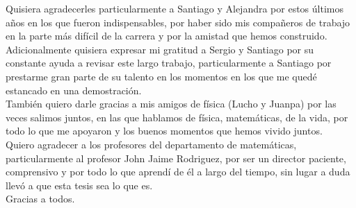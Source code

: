 Quisiera agradecerles particularmente a Santiago y Alejandra por estos últimos años en los que fueron indispensables, por haber sido mis compañeros de trabajo en la parte más difícil de la carrera y por la amistad que hemos construido.\\

Adicionalmente quisiera expresar mi gratitud a Sergio y Santiago por su constante ayuda a revisar este largo trabajo, particularmente a Santiago por prestarme gran parte de su talento en los momentos en los que me quedé estancado en una demostración.\\

También quiero darle gracias a  mis amigos de física (Lucho y Juanpa) por las veces salimos juntos, en las que hablamos de física, matemáticas, de la vida, por todo lo que me apoyaron y los buenos momentos que hemos vivido juntos.\\

Quiero agradecer a los profesores del departamento de matemáticas, particularmente al profesor John Jaime Rodriguez, por ser un director paciente, comprensivo y por todo lo que aprendí de él a largo del tiempo, sin lugar a duda llevó a que esta tesis sea lo que es.\\

Gracias a todos.
\thispagestyle{empty}
